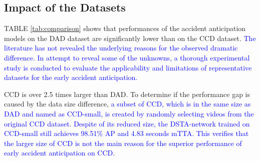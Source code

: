 \documentclass[journal]{IEEEtran}
\begin{document}
\subsection{Impact of the Datasets}
TABLE \ref{tab:comparison} shows that performances of the accident anticipation models on the DAD dataset are significantly lower than on the CCD dataset. \textcolor{blue}{The literature has not revealed the underlying reasons for the observed dramatic difference. In attempt to reveal some of the unknowns, a thorough experimental study is conducted to evaluate the applicability and limitations of representative datasets for the early accident anticipation.} 

CCD is over 2.5 times larger than DAD. To determine if the performance gap is caused by the data size difference, \textcolor{blue}{a subset of CCD, which is in the same size as DAD and named as CCD-small, is created by randomly selecting videos from the original CCD dataset. Despite of its reduced size, the DSTA-network trained on CCD-small still achieves 98.51\% AP and 4.83 seconds mTTA. This verifies that the larger size of CCD is not the main reason for the superior performance of early accident anticipation on CCD.} 
\end{document}
